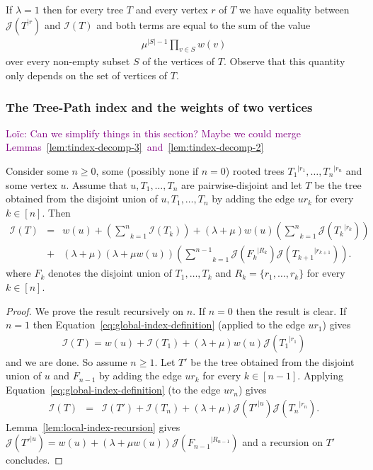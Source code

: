 \documentclass[11 pt]{modarticle}
\newcommand{\wmap}{w}
\newcommand{\size}[1]{|#1|}
\newcommand{\rtree}[2]{{#1}^{\lvert #2}}
\newcommand{\indexsymbol}{\mathcal{I}}
\newcommand{\tindex}[1]{\indexsymbol(#1)}
\newcommand{\rindexsymbol}{\mathcal{J}}
\newcommand{\rindex}[2]{\rindexsymbol(\rtree{#2}{#1})}
\newcommand{\ldcomment}[1]{\textcolor{purple}{{\footnotesize Loïc:} #1}}
\begin{document}
\begin{rem}\label{rem:degenerate}
If $\lambda = 1$ then for every tree $T$ and every vertex $r$ of $T$ we have equality between $\rindex{r}{T}$ and $\tindex{T}$ and both terms are equal to the sum of the value
\begin{eqnarray*}
	\mu^{\size{S}-1} \underset{v \in S}{\prod} \wmap(v)
\end{eqnarray*}
over every non-empty subset $S$ of the vertices of $T$. Observe that this quantity only depends on the set of vertices of $T$.
\end{rem}

\subsubsection{The Tree-Path index and the weights of two vertices}

\ldcomment{Can we simplify things in this section? Maybe we could merge Lemmas~\ref{lem:tindex-decomp-3}~and~\ref{lem:tindex-decomp-2}}

\begin{lem}\label{lem:tindex-decomp-1}
Consider some $n \geq 0$, some (possibly none if $n=0$) rooted trees $\rtree{T_1}{r_1}, \dots, \rtree{T_n}{r_n}$ and some vertex $u$. Assume that $u, T_1, \dots, T_n$ are pairwise-disjoint and let $T$ be the tree obtained from the disjoint union of $u, T_1, \dots, T_n$ by adding the edge $u r_k$ for every $k \in [n]$. Then
\begin{eqnarray*}
	\tindex{T} & = & \wmap(u) + \left(\underset{k=1}{\overset{n}{\sum}} \tindex{T_k}\right) + (\lambda + \mu)\wmap(u)\left(\underset{k=1}{\overset{n}{\sum}}\rindex{r_k}{T_k}\right) \\
	& + & (\lambda + \mu)(\lambda + \mu \wmap(u))\left(\underset{k=1}{\overset{n-1}{\sum}}\rindex{R_k}{F_k}\rindex{r_{k+1}}{T_{k+1}}\right).
\end{eqnarray*}
where $F_k$ denotes the disjoint union of $T_1, \dots, T_k$ and $R_k = \{r_1, \dots, r_k\}$ for every $k \in [n]$.
\end{lem}

\begin{proof}
We prove the result recursively on $n$. If $n = 0$ then the result is clear. If $n = 1$ then Equation~\eqref{eq:global-index-definition} (applied to the edge $u r_1$) gives
\begin{eqnarray*}
	\tindex{T} = \wmap(u) + \tindex{T_1} + (\lambda + \mu)\wmap(u) \rindex{r_1}{T_1}
\end{eqnarray*}
and we are done. So assume $n \geq 1$. Let $T'$ be the tree obtained from the disjoint union of $u$ and $F_{n-1}$ by adding the edge $u r_k$ for every $k \in [n-1]$. Applying Equation~\eqref{eq:global-index-definition} (to the edge $u r_n$) gives
\begin{eqnarray*}
	\tindex{T} & = & \tindex{T'} + \tindex{T_n} + (\lambda + \mu) \rindex{u}{T'} \rindex{r_n}{T_n}.
\end{eqnarray*}
Lemma~\ref{lem:local-index-recursion} gives $\rindex{u}{T'} = \wmap(u) + (\lambda + \mu \wmap(u)) \rindex{R_{n-1}}{F_{n-1}}$ and a recursion on $T'$ concludes.
\end{proof}
\end{document}
